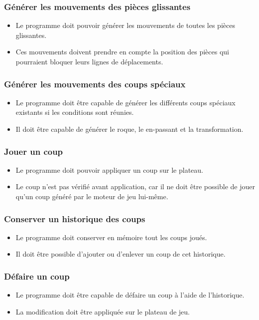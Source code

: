 \documentclass{article}
\begin{document}
\subsubsection{Générer les mouvements des pièces glissantes}
\begin{itemize}
    \item Le programme doit pouvoir générer les mouvements de toutes les pièces glissantes.
    \item Ces mouvements doivent prendre en compte la position des pièces qui pourraient bloquer leurs lignes de déplacements.
\end{itemize}
\medskip
\subsubsection{Générer les mouvements des coups spéciaux}
\begin{itemize}
    \item Le programme doit être capable de générer les différents coups spéciaux existants si les conditions sont réunies.
    \item Il doit être capable de générer le roque, le en-passant et la transformation.
\end{itemize}
\medskip
\subsubsection{Jouer un coup}
\begin{itemize}
    \item Le programme doit pouvoir appliquer un coup sur le plateau.
    \item Le coup n'est pas vérifié avant application, car il ne doit être possible de jouer qu'un coup généré par le moteur de jeu lui-même.
\end{itemize}

\medskip
\subsubsection{Conserver un historique des coups}
\begin{itemize}
    \item Le programme doit conserver en mémoire tout les coups joués.
    \item Il doit être possible d'ajouter ou d'enlever un coup de cet historique.
\end{itemize}
\medskip
\subsubsection{Défaire un coup}
\begin{itemize}
    \item Le programme doit être capable de défaire un coup à l'aide de l'historique.
    \item La modification doit être appliquée sur le plateau de jeu.
\end{itemize}
\medskip
\end{document}
